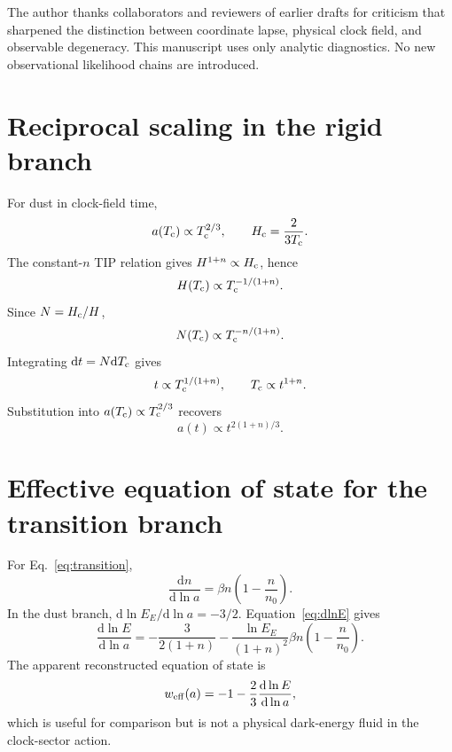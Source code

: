 \documentclass[aps,prd,reprint,nofootinbib,superscriptaddress,longbibliography]{revtex4-2}
\newcommand{\dd}{\mathrm{d}}
\newcommand{\Tc}{T_{\rm c}}
\newcommand{\Hc}{H_{\rm c}}
\begin{document}
\begin{acknowledgments}
The author thanks collaborators and reviewers of earlier drafts for criticism that sharpened the distinction between coordinate lapse, physical clock field, and observable degeneracy.  This manuscript uses only analytic diagnostics.  No new observational likelihood chains are introduced.
\end{acknowledgments}

\appendix

\section{Reciprocal scaling in the rigid branch}

For dust in clock-field time,
\begin{equation}
  a(\Tc)\propto \Tc^{2/3},\qquad \Hc=\frac{2}{3\Tc} .
\end{equation}
The constant-$n$ TIP relation gives $H^{1+n}\propto\Hc$, hence
\begin{equation}
  H(\Tc)\propto\Tc^{-1/(1+n)} .
\end{equation}
Since $N=\Hc/H$,
\begin{equation}
  N(\Tc)\propto\Tc^{-n/(1+n)} .
\end{equation}
Integrating $\dd t=N\dd\Tc$ gives
\begin{equation}
  t\propto\Tc^{1/(1+n)},\qquad \Tc\propto t^{1+n} .
\end{equation}
Substitution into $a(\Tc)\propto\Tc^{2/3}$ recovers
\begin{equation}
  a(t)\propto t^{2(1+n)/3} .
\end{equation}

\section{Effective equation of state for the transition branch}

For Eq.~\eqref{eq:transition},
\begin{equation}
  \frac{\dd n}{\dd\ln a}=\beta n\left(1-\frac{n}{n_0}\right).
\end{equation}
In the dust branch, $\dd\ln E_E/\dd\ln a=-3/2$.  Equation~\eqref{eq:dlnE} gives
\begin{equation}
  \frac{\dd\ln E}{\dd\ln a}
  =-\frac{3}{2(1+n)}-
  \frac{\ln E_E}{(1+n)^2}\beta n\left(1-\frac{n}{n_0}\right).
\end{equation}
The apparent reconstructed equation of state is
\begin{equation}
  w_{\rm eff}(a)=-1-\frac{2}{3}\frac{\dd\ln E}{\dd\ln a},
\end{equation}
which is useful for comparison but is not a physical dark-energy fluid in the clock-sector action.
\end{document}

